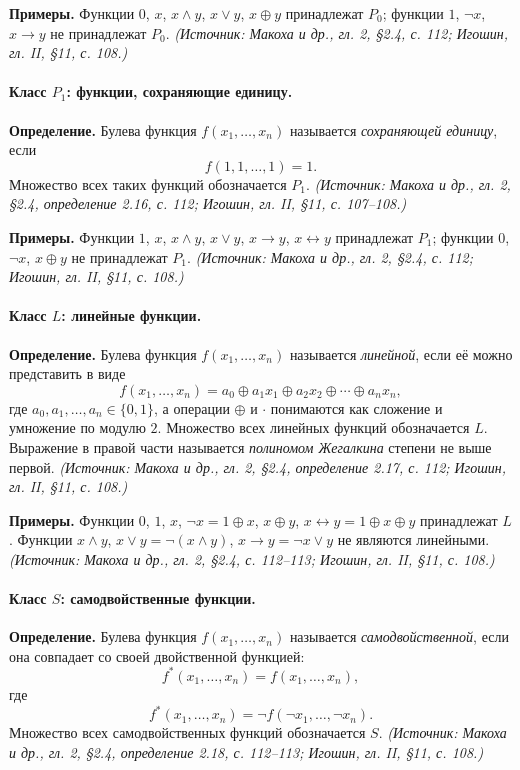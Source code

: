 \documentclass[a4paper,12pt]{article}
\begin{document}
\textbf{Примеры.} Функции \(0\), \(x\), \(x\land y\), \(x\lor y\), \(x\oplus y\) принадлежат \(P_0\); функции \(1\), \(\neg x\), \(x\to y\) не принадлежат \(P_0\).
\textit{(Источник: Макоха и др., гл. 2, §2.4, с. 112; Игошин, гл. II, §11, с. 108.)}

\paragraph{Класс \(P_1\): функции, сохраняющие единицу.}
\textbf{Определение.} Булева функция \(f(x_1,\ldots,x_n)\) называется \emph{сохраняющей единицу}, если
\[
f(1,1,\ldots,1)=1.
\]
Множество всех таких функций обозначается \(P_1\).
\textit{(Источник: Макоха и др., гл. 2, §2.4, определение 2.16, с. 112; Игошин, гл. II, §11, с. 107--108.)}

\textbf{Примеры.} Функции \(1\), \(x\), \(x\land y\), \(x\lor y\), \(x\to y\), \(x\leftrightarrow y\) принадлежат \(P_1\); функции \(0\), \(\neg x\), \(x\oplus y\) не принадлежат \(P_1\).
\textit{(Источник: Макоха и др., гл. 2, §2.4, с. 112; Игошин, гл. II, §11, с. 108.)}

\paragraph{Класс \(L\): линейные функции.}
\textbf{Определение.} Булева функция \(f(x_1,\ldots,x_n)\) называется \emph{линейной}, если её можно представить в виде
\[
f(x_1,\ldots,x_n)=a_0\oplus a_1x_1\oplus a_2x_2\oplus\cdots\oplus a_nx_n,
\]
где \(a_0,a_1,\ldots,a_n\in\{0,1\}\), а операции \(\oplus\) и \(\cdot\) понимаются как сложение и умножение по модулю \(2\). Множество всех линейных функций обозначается \(L\). Выражение в правой части называется \emph{полиномом Жегалкина} степени не выше первой.
\textit{(Источник: Макоха и др., гл. 2, §2.4, определение 2.17, с. 112; Игошин, гл. II, §11, с. 108.)}

\textbf{Примеры.} Функции \(0\), \(1\), \(x\), \(\neg x=1\oplus x\), \(x\oplus y\), \(x\leftrightarrow y=1\oplus x\oplus y\) принадлежат \(L\). Функции \(x\land y\), \(x\lor y=\neg(x\land y)\), \(x\to y=\neg x\lor y\) не являются линейными.
\textit{(Источник: Макоха и др., гл. 2, §2.4, с. 112--113; Игошин, гл. II, §11, с. 108.)}

\paragraph{Класс \(S\): самодвойственные функции.}
\textbf{Определение.} Булева функция \(f(x_1,\ldots,x_n)\) называется \emph{самодвойственной}, если она совпадает со своей двойственной функцией:
\[
f^*(x_1,\ldots,x_n)=f(x_1,\ldots,x_n),
\]
где
\[
f^*(x_1,\ldots,x_n)=\neg f(\neg x_1,\ldots,\neg x_n).
\]
Множество всех самодвойственных функций обозначается \(S\).
\textit{(Источник: Макоха и др., гл. 2, §2.4, определение 2.18, с. 112--113; Игошин, гл. II, §11, с. 108.)}
\end{document}
